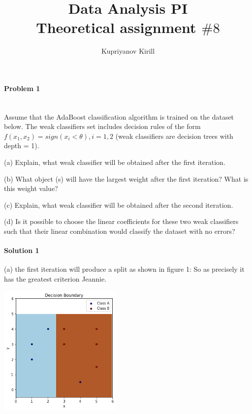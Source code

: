 \documentclass{article}
\author{Kupriyanov Kirill}
\title{Data Analysis PI\\Theoretical assignment $\#8$}
\date{}
\begin{document}
\maketitle
\thispagestyle{empty}
\newpage

\maketitle

\paragraph{Problem 1}\mbox{}\\

Assume that the AdaBoost classification algorithm is trained on the dataset below. The weak classifiers
set includes decision rules of the form $f(x_1, x_2) = sign(x_i < \theta), i = 1, 2$ (weak classifiers are decision
trees with depth = 1).


(a) Explain, what weak classifier will be obtained after the first iteration.

(b) What object (s) will have the largest weight after the first iteration? What is this weight value?

(c) Explain, what weak classifier will be obtained after the second iteration.

(d) Is it possible to choose the linear coefficients for these two weak classifiers such that their linear
combination would classify the dataset with no errors?

\paragraph{Solution 1}\mbox{}

(a) the first iteration will produce a split as shown in figure 1:
So as precisely it has the greatest criterion Jeannie.



\includegraphics[width=6cm] {1.png}
\end{document}
